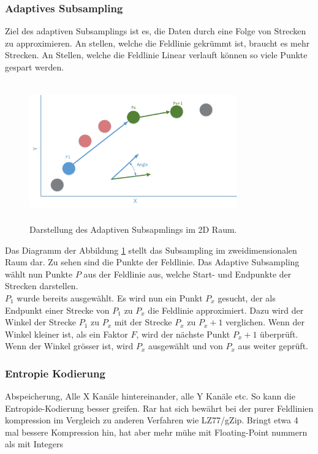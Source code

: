 \subsubsection{Adaptives Subsampling}\label{konzept:loesung0:subsampling}
Ziel des adaptiven Subsamplings ist es, die Daten durch eine Folge von Strecken zu approximieren. An stellen, welche die Feldlinie gekrümmt ist, braucht es mehr Strecken. An Stellen, welche die Feldlinie Linear verlauft können so viele Punkte gespart werden. 
\begin{figure}[!htbp]
	\center
	\includegraphics[width=0.8\textwidth,height=6cm,keepaspectratio]{./pictures/konzept/solution0/anglesubsampling.png}
	\caption{Darstellung des Adaptiven Subsapmlings im 2D Raum.}
	\label{konzept:loesung0:angle}
\end{figure}
Das Diagramm der Abbildung \ref{konzept:loesung0:angle} stellt das Subsampling im zweidimensionalen Raum dar. Zu sehen sind die Punkte der Feldlinie. Das Adaptive Subsampling wählt nun Punkte $P$ aus der Feldlinie aus, welche Start- und Endpunkte der Strecken darstellen.\\
$P_1$ wurde bereits ausgewählt. Es wird nun ein Punkt $P_x$ gesucht, der als Endpunkt einer Strecke von $P_1$ zu $P_x$ die Feldlinie approximiert. Dazu wird der Winkel der Strecke $P_1$ zu $P_x$ mit der Strecke $P_x$ zu $P_x+1$ verglichen. Wenn der Winkel kleiner ist, als ein Faktor $F$, wird der nächste Punkt $P_x+1$ überprüft. Wenn der Winkel grösser ist, wird $P_x$ ausgewählt und von $P_x$ aus weiter geprüft.

\subsubsection{Entropie Kodierung} \label{konzept:loesung0:kodierung}
Abspeicherung, Alle X Kanäle hintereinander, alle Y Kanäle etc. So kann die Entropide-Kodierung besser greifen.
Rar hat sich bewährt bei der purer Feldlinien kompression im Vergleich zu anderen Verfahren wie LZ77/gZip. Bringt etwa 4 mal bessere Kompression hin, hat aber mehr mühe mit Floating-Point nummern als mit Integers

